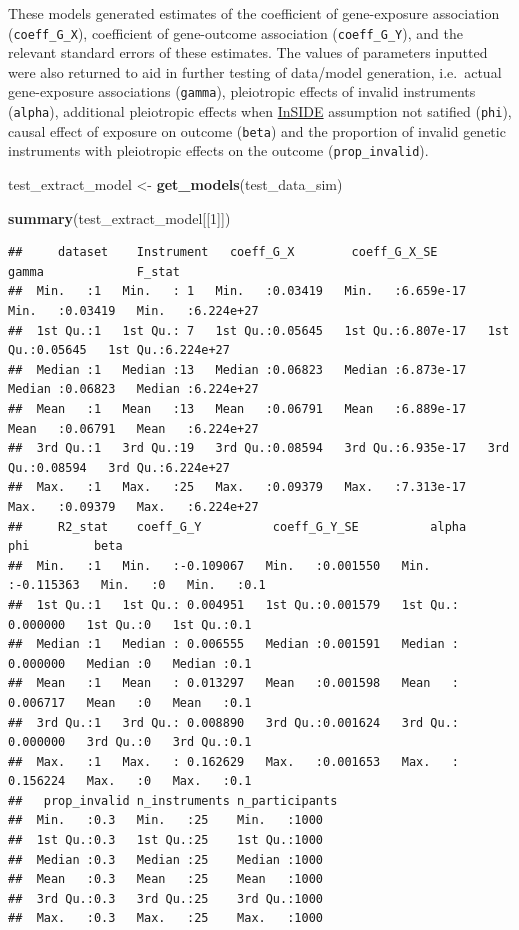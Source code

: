 \documentclass[
]{article}
\newenvironment{Shaded}{\begin{snugshade}}{\end{snugshade}}
\newcommand{\DecValTok}[1]{\textcolor[rgb]{0.00,0.00,0.81}{#1}}
\newcommand{\FunctionTok}[1]{\textcolor[rgb]{0.13,0.29,0.53}{\textbf{#1}}}
\newcommand{\NormalTok}[1]{#1}
\newcommand{\OtherTok}[1]{\textcolor[rgb]{0.56,0.35,0.01}{#1}}
\begin{document}
These models generated estimates of the coefficient of gene-exposure association (\texttt{coeff\_G\_X}), coefficient of gene-outcome association (\texttt{coeff\_G\_Y}), and the relevant standard errors of these estimates. The values of parameters inputted were also returned to aid in further testing of data/model generation, i.e.~actual gene-exposure associations (\texttt{gamma}), pleiotropic effects of invalid instruments (\texttt{alpha}), additional pleiotropic effects when \hyperref[acronyms_InSIDE]{InSIDE} assumption not satified (\texttt{phi}), causal effect of exposure on outcome (\texttt{beta}) and the proportion of invalid genetic instruments with pleiotropic effects on the outcome (\texttt{prop\_invalid}).

\begin{Shaded}
\begin{Highlighting}[]
\NormalTok{test\_extract\_model }\OtherTok{\textless{}{-}} \FunctionTok{get\_models}\NormalTok{(test\_data\_sim)}

\FunctionTok{summary}\NormalTok{(test\_extract\_model[[}\DecValTok{1}\NormalTok{]])}
\end{Highlighting}
\end{Shaded}

\begin{verbatim}
##     dataset    Instrument   coeff_G_X        coeff_G_X_SE           gamma             F_stat         
##  Min.   :1   Min.   : 1   Min.   :0.03419   Min.   :6.659e-17   Min.   :0.03419   Min.   :6.224e+27  
##  1st Qu.:1   1st Qu.: 7   1st Qu.:0.05645   1st Qu.:6.807e-17   1st Qu.:0.05645   1st Qu.:6.224e+27  
##  Median :1   Median :13   Median :0.06823   Median :6.873e-17   Median :0.06823   Median :6.224e+27  
##  Mean   :1   Mean   :13   Mean   :0.06791   Mean   :6.889e-17   Mean   :0.06791   Mean   :6.224e+27  
##  3rd Qu.:1   3rd Qu.:19   3rd Qu.:0.08594   3rd Qu.:6.935e-17   3rd Qu.:0.08594   3rd Qu.:6.224e+27  
##  Max.   :1   Max.   :25   Max.   :0.09379   Max.   :7.313e-17   Max.   :0.09379   Max.   :6.224e+27  
##     R2_stat    coeff_G_Y          coeff_G_Y_SE          alpha                phi         beta    
##  Min.   :1   Min.   :-0.109067   Min.   :0.001550   Min.   :-0.115363   Min.   :0   Min.   :0.1  
##  1st Qu.:1   1st Qu.: 0.004951   1st Qu.:0.001579   1st Qu.: 0.000000   1st Qu.:0   1st Qu.:0.1  
##  Median :1   Median : 0.006555   Median :0.001591   Median : 0.000000   Median :0   Median :0.1  
##  Mean   :1   Mean   : 0.013297   Mean   :0.001598   Mean   : 0.006717   Mean   :0   Mean   :0.1  
##  3rd Qu.:1   3rd Qu.: 0.008890   3rd Qu.:0.001624   3rd Qu.: 0.000000   3rd Qu.:0   3rd Qu.:0.1  
##  Max.   :1   Max.   : 0.162629   Max.   :0.001653   Max.   : 0.156224   Max.   :0   Max.   :0.1  
##   prop_invalid n_instruments n_participants
##  Min.   :0.3   Min.   :25    Min.   :1000  
##  1st Qu.:0.3   1st Qu.:25    1st Qu.:1000  
##  Median :0.3   Median :25    Median :1000  
##  Mean   :0.3   Mean   :25    Mean   :1000  
##  3rd Qu.:0.3   3rd Qu.:25    3rd Qu.:1000  
##  Max.   :0.3   Max.   :25    Max.   :1000
\end{verbatim}
\end{document}
